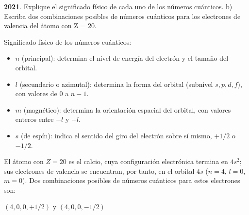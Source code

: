\begin{exerciseEVAU}
    \textbf{2021}.
    Explique el significado físico de cada uno de los números cuánticos. b) Escriba dos combinaciones posibles de números cuánticos para los electrones de valencia del átomo con Z = 20.
    \begin{solu}
        Significado físico de los números cuánticos:
        \begin{itemize}
            \item \(n\) (principal): determina el nivel de energía del electrón y el tamaño del orbital.
            \item \(l\) (secundario o azimutal): determina la forma del orbital (subnivel \(s, p, d, f\)), con valores de \(0\) a \(n-1\).
            \item \(m\) (magnético): determina la orientación espacial del orbital, con valores enteros entre \(-l\) y \(+l\).
            \item \(s\) (de espín): indica el sentido del giro del electrón sobre sí mismo, \(+1/2\) o \(-1/2\).
        \end{itemize}
        El átomo con \(Z=20\) es el calcio, cuya configuración electrónica termina en \(4s^2\); sus electrones de valencia se encuentran, por tanto, en el orbital \(4s\) (\(n=4\), \(l=0\), \(m=0\)). Dos combinaciones posibles de números cuánticos para estos electrones son:
        \begin{center}
            \((4,0,0,+1/2)\) \qquad y \qquad \((4,0,0,-1/2)\)
        \end{center}
    \end{solu}
\end{exerciseEVAU}

\